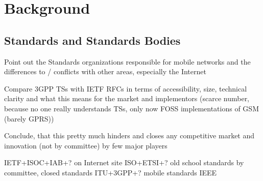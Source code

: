 \section{Background}
\label{c4:background}


\subsection{Standards and Standards Bodies}

Point out the Standards organizations responsible for mobile networks and the differences to / conflicts with other areas, especially the Internet

Compare \gls{3GPP} \glspl{TS} with \gls{IETF} \glspl{RFC} in terms of accessibility, size, technical clarity and what this means for the market and implementors (scarce number, because no one really understands TSs, only now \gls{FOSS} implementations of \gls{GSM} (barely \gls{GPRS}))

Conclude, that this pretty much hinders and closes any competitive market and innovation (not by committee) by few major players

\gls{IETF}+\gls{ISOC}+\gls{IAB}+? on Internet site
\gls{ISO}+\gls{ETSI}+? old school standards by committee, closed standards
\gls{ITU}+\gls{3GPP}+? mobile standards
\gls{IEEE}








